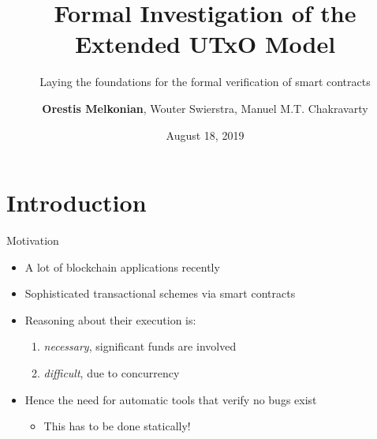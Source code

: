 \documentclass[aspectratio=43]{beamer}
\title{Formal Investigation of the Extended UTxO Model}
\subtitle{Laying the foundations for the formal verification of smart contracts}
\author{\textbf{Orestis Melkonian}, Wouter Swierstra, Manuel M.T. Chakravarty}
\date{August 18, 2019}
\renewcommand\alert[1]{\textcolor{mLightBrown}{#1}}
\begin{document}
\begin{center}
\maketitle
{}
\end{center}

\section{Introduction}

\begin{frame}{Motivation}
\begin{itemize}
\item A lot of blockchain applications recently
\item Sophisticated transactional schemes via \alert{smart contracts}
\item Reasoning about their execution is:
  \begin{enumerate}
  \item \textit{necessary}, significant funds are involved
  \item \textit{difficult}, due to concurrency
  \end{enumerate}
\item Hence the need for automatic tools that verify no bugs exist
  \begin{itemize}
  \item This has to be done \alert{statically}!
  \end{itemize}
\end{itemize}
\end{frame}
\end{document}
